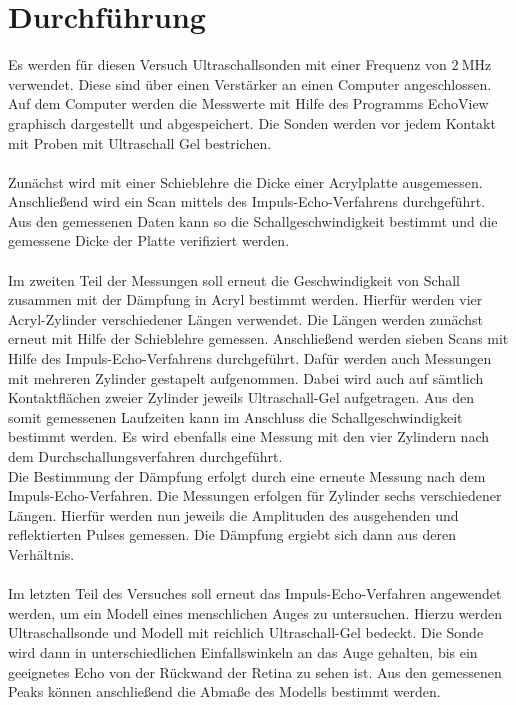 \section{Durchführung}
\label{sec:Durchführung}

Es werden für diesen Versuch Ultraschallsonden mit einer Frequenz von $\qty{2}{\mega\hertz}$ verwendet. Diese sind über einen Verstärker an einen Computer angeschlossen.
Auf dem Computer werden die Messwerte mit Hilfe des Programms EchoView graphisch dargestellt und abgespeichert. Die Sonden werden vor jedem Kontakt mit Proben mit Ultraschall
Gel bestrichen. \\
\\
Zunächst wird mit einer Schieblehre die Dicke einer Acrylplatte ausgemessen. Anschließend wird ein Scan mittels des Impuls-Echo-Verfahrens durchgeführt. Aus den gemessenen
Daten kann so die Schallgeschwindigkeit bestimmt und die gemessene Dicke der Platte verifiziert werden. \\
\\
Im zweiten Teil der Messungen soll erneut die Geschwindigkeit von Schall zusammen mit der Dämpfung in Acryl bestimmt werden. Hierfür werden vier Acryl-Zylinder verschiedener
Längen verwendet. Die Längen werden zunächst erneut mit Hilfe der Schieblehre gemessen. Anschließend werden sieben Scans mit Hilfe des Impuls-Echo-Verfahrens durchgeführt. Dafür
werden auch Messungen mit mehreren Zylinder gestapelt aufgenommen. Dabei wird auch auf sämtlich Kontaktflächen zweier Zylinder jeweils Ultraschall-Gel aufgetragen. Aus den somit
gemessenen Laufzeiten kann im Anschluss die Schallgeschwindigkeit bestimmt werden. Es wird ebenfalls eine Messung mit den vier Zylindern nach dem Durchschallungsverfahren durchgeführt.
\\
Die Bestimmung der Dämpfung erfolgt durch eine erneute Messung nach dem Impuls-Echo-Verfahren. Die Messungen erfolgen für Zylinder sechs verschiedener Längen. Hierfür werden
nun jeweils die Amplituden des ausgehenden und reflektierten Pulses gemessen. Die Dämpfung ergiebt sich dann aus deren Verhältnis.\\
\\
Im letzten Teil des Versuches soll erneut das Impuls-Echo-Verfahren angewendet werden, um ein Modell eines menschlichen Auges zu untersuchen. Hierzu werden Ultraschallsonde und
Modell mit reichlich Ultraschall-Gel bedeckt. Die Sonde wird dann in unterschiedlichen Einfallswinkeln an das Auge gehalten, bis ein geeignetes Echo von der Rückwand der Retina
zu sehen ist. Aus den gemessenen Peaks können anschließend die Abmaße des Modells bestimmt werden.


